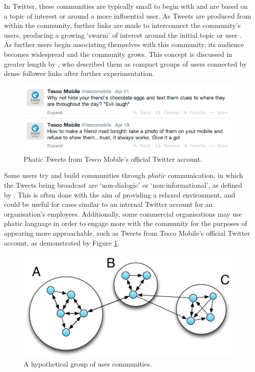 In Twitter, these communities are typically small to begin with and are based on a topic of interest or around a more influential user. As Tweets are produced from within the community, further links are made to interconnect the community's users, producing a growing `swarm' of interest around the initial topic or user \cite{java07}. As further users begin associating themselves with this community, its audience becomes widespread and the community grows. This concept is discussed in greater length by \citet{java07}, who described them as compact groups of users connected by dense follower links after further experimentation.

\begin{figure}[h]
\centering
\includegraphics[scale=0.75]{2.Background/Media/tesco_mobile.png} 
\caption{Phatic Tweets from Tesco Mobile's official Twitter account.}
\label{fig:tesco_mobile}
\end{figure}

Some users try and build communities through \textit{phatic} communication, in which the Tweets being broadcast are `non-dialogic' or `non-informational', as defined by \citet{miller08}. This is often done with the aim of providing a relaxed environment, and could be useful for cases similar to an internal Twitter account for an organisation's employees. Additionally, some commercial organisations may use phatic language in order to engage more with the community for the purposes of appearing more approachable, such as Tweets from Tesco Mobile's official Twitter account, as demonstrated by Figure \ref{fig:tesco_mobile}. 

\begin{figure}[h]
\centering
\includegraphics[scale=0.7]{2.Background/Media/communities.png} 
\caption{A hypothetical group of user communities.}
\label{fig:communities}
\end{figure}

